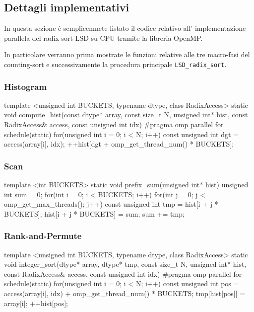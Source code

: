 \subsection{Dettagli implementativi}
In questa sezione è semplicemnete listato il codice relativo all' implementazione parallela del radix-sort LSD su CPU tramite la libreria OpenMP. 

In particolare verranno prima mostrate le funzioni relative alle tre macro-fasi del counting-sort e successivamente la procedura principale \texttt{LSD\_radix\_sort}.


\subsubsection{Histogram}
\begin{cpp}
template <unsigned int BUCKETS, typename dtype, class RadixAccess>
static void compute_hist(const dtype* array, const size_t N, 
                         unsigned int* hist,
                         const RadixAccess& access, 
                         const unsigned int idx){
	#pragma omp parallel for schedule(static)
	for(unsigned int i = 0; i < N; i++){
		const unsigned int dgt = access(array[i], idx);
		++hist[dgt + omp_get_thread_num() * BUCKETS]; 
	}
}
\end{cpp}

\medskip
\subsubsection{Scan}
\begin{cpp}
template <int BUCKETS>
static void prefix_sum(unsigned int* hist){
	unsigned int sum = 0;
	for(int i = 0; i < BUCKETS; i++)
	for(int j = 0; j < omp_get_max_threads(); j++){
		const unsigned int tmp = hist[i + j * BUCKETS];
		hist[i + j * BUCKETS] = sum;
		sum += tmp;
	}   
}
\end{cpp}

\medskip
\subsubsection{Rank-and-Permute}
\begin{cpp}
template <unsigned int BUCKETS, typename dtype, class RadixAccess>
static void integer_sort(dtype* array, dtype* tmp, const size_t N, 
                         unsigned int* hist, 
                         const RadixAccess& access, 
                         const unsigned int idx){
	#pragma omp parallel for schedule(static)
	for(unsigned int i = 0; i < N; i++){
		const unsigned int pos = access(array[i], idx) + omp_get_thread_num() * BUCKETS;
		tmp[hist[pos]] = array[i];
		++hist[pos];
	}
}	
\end{cpp}

